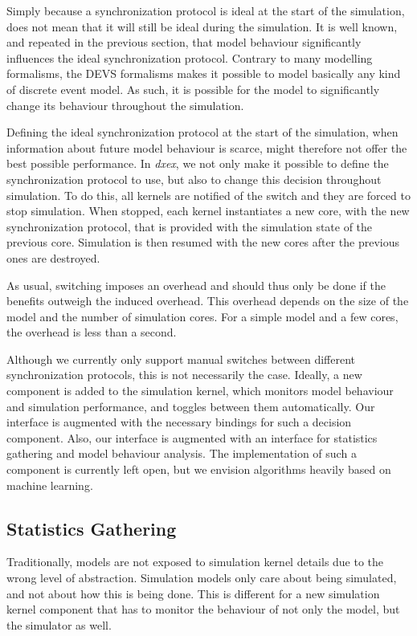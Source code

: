 Simply because a synchronization protocol is ideal at the start of the simulation, does not mean that it will still be ideal during the simulation.
It is well known, and repeated in the previous section, that model behaviour significantly influences the ideal synchronization protocol.
Contrary to many modelling formalisms, the \textsf{DEVS} formalisms makes it possible to model basically any kind of discrete event model.
As such, it is possible for the model to significantly change its behaviour throughout the simulation.

Defining the ideal synchronization protocol at the start of the simulation, when information about future model behaviour is scarce, might therefore not offer the best possible performance.
In \textit{dxex}, we not only make it possible to define the synchronization protocol to use, but also to change this decision throughout simulation.
To do this, all kernels are notified of the switch and they are forced to stop simulation.
When stopped, each kernel instantiates a new core, with the new synchronization protocol, that is provided with the simulation state of the previous core.
Simulation is then resumed with the new cores after the previous ones are destroyed.

As usual, switching imposes an overhead and should thus only be done if the benefits outweigh the induced overhead.
This overhead depends on the size of the model and the number of simulation cores.
For a simple model and a few cores, the overhead is less than a second.

Although we currently only support manual switches between different synchronization protocols, this is not necessarily the case.
Ideally, a new component is added to the simulation kernel, which monitors model behaviour and simulation performance, and toggles between them automatically.
Our interface is augmented with the necessary bindings for such a decision component.
Also, our interface is augmented with an interface for statistics gathering and model behaviour analysis.
The implementation of such a component is currently left open, but we envision algorithms heavily based on machine learning.

\subsection{Statistics Gathering}
Traditionally, models are not exposed to simulation kernel details due to the wrong level of abstraction.
Simulation models only care about being simulated, and not about how this is being done.
This is different for a new simulation kernel component that has to monitor the behaviour of not only the model, but the simulator as well.

